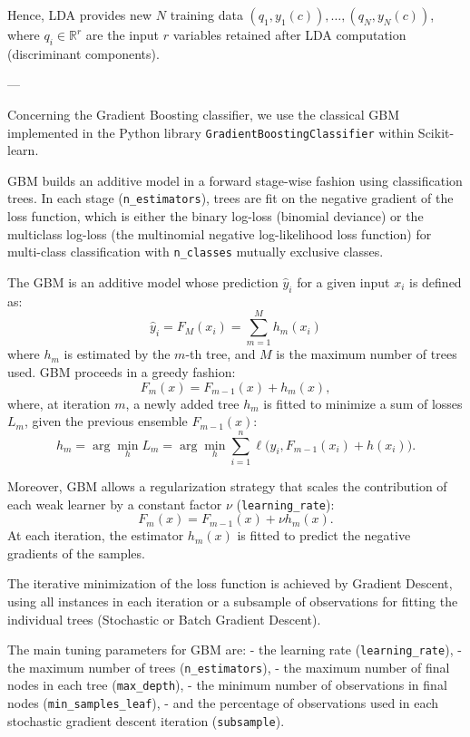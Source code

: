 \documentclass[11pt,a4paper]{article}
\begin{document}
Hence, LDA provides new $N$ training data $(q_1, y_1(c)), \dots, (q_N, y_N(c))$, where $q_i \in \mathbb{R}^r$ are the input $r$ variables retained after LDA computation (discriminant components).

---

Concerning the Gradient Boosting classifier, we use the classical GBM \citep{friedman2001greedy} implemented in the Python library \texttt{GradientBoostingClassifier} within Scikit-learn.  

GBM builds an additive model in a forward stage-wise fashion using classification trees.  
In each stage (\texttt{n\_estimators}), trees are fit on the negative gradient of the loss function, which is either the binary log-loss (binomial deviance) or the multiclass log-loss (the multinomial negative log-likelihood loss function) for multi-class classification with \texttt{n\_classes} mutually exclusive classes.

The GBM is an additive model whose prediction $\hat{y}_i$ for a given input $x_i$ is defined as:
\[
\hat{y}_i = F_M(x_i) = \sum_{m=1}^M h_m(x_i) \tag{1}
\]
where $h_m$ is estimated by the $m$-th tree, and $M$ is the maximum number of trees used.  
GBM proceeds in a greedy fashion:
\[
F_m(x) = F_{m-1}(x) + h_m(x),
\]
where, at iteration $m$, a newly added tree $h_m$ is fitted to minimize a sum of losses $L_m$, given the previous ensemble $F_{m-1}(x)$:
\[
h_m = \arg \min_h L_m = \arg \min_h \sum_{i=1}^n \ell \Big(y_i, F_{m-1}(x_i) + h(x_i)\Big). \tag{2}
\]

Moreover, GBM allows a regularization strategy that scales the contribution of each weak learner by a constant factor $\nu$ (\texttt{learning\_rate}):
\[
F_m(x) = F_{m-1}(x) + \nu h_m(x).
\]
At each iteration, the estimator $h_m(x)$ is fitted to predict the negative gradients of the samples.

The iterative minimization of the loss function is achieved by Gradient Descent, using all instances in each iteration or a subsample of observations for fitting the individual trees (Stochastic or Batch Gradient Descent).

The main tuning parameters for GBM are:  
- the learning rate (\texttt{learning\_rate}),  
- the maximum number of trees (\texttt{n\_estimators}),  
- the maximum number of final nodes in each tree (\texttt{max\_depth}),  
- the minimum number of observations in final nodes (\texttt{min\_samples\_leaf}),  
- and the percentage of observations used in each stochastic gradient descent iteration (\texttt{subsample}).
\end{document}
